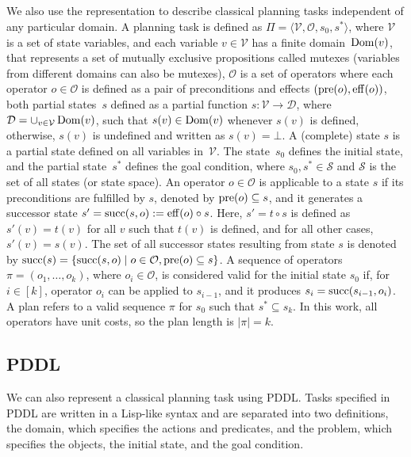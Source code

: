 \documentclass[ppgc,diss,english]{iiufrgs}
\begin{document}
\subsection{\sas}
\label{sec:background-sas}
We also use the \sas representation to describe classical planning tasks independent of any particular domain. A \sas planning task is defined as $\Pi=\langle\mathcal{V},\mathcal{O},s_0,s^*\rangle$, where $\mathcal{V}$ is a set of state variables, and each variable $v\in \mathcal{V}$ has a finite domain~$\operatorname{Dom}(v)$, that represents a set of mutually exclusive propositions called mutexes (variables from different domains can also be mutexes), $\mathcal{O}$ is a set of operators where each operator $o \in \mathcal{O}$ is defined as a pair of preconditions and effects $(\operatorname{pre}(o),\operatorname{eff}(o))$, both partial states~$s$ defined as a partial function $s:\mathcal{V}\rightarrow \mathcal{D}$, where $\mathcal{D}=\cup_{v\in \mathcal{V}}\operatorname{Dom}(v)$, such that $s(v)\in \operatorname{Dom}(v)$ whenever $s(v)$ is defined, otherwise, $s(v)$ is undefined and written as $s(v)=\bot$.  A (complete) state $s$ is a partial state defined on all variables in~$\mathcal{V}$. The state~$s_0$ defines the initial state, and the partial state~$s^*$ defines the goal condition, where $s_0, s^* \in \mathcal{S}$ and $\mathcal{S}$ is the set of all states (or state space).
An operator $o \in \mathcal{O}$ is applicable to a state $s$ if its preconditions are fulfilled by $s$, denoted by $\operatorname{pre}(o) \subseteq s$, and it generates a successor state $s'=\operatorname{succ}(s,o):=\operatorname{eff}(o)\circ s$. Here, $s'=t\circ s$ is defined as $s'(v)=t(v)$ for all $v$ such that $t(v)$ is defined, and for all other cases, $s'(v)=s(v)$. The set of all successor states resulting from state $s$ is denoted by $\operatorname{succ}(s)=\{{\operatorname{succ}(s,o)\mid o\in \mathcal{O}, \operatorname{pre}(o) \subseteq s}\}$. A sequence of operators $\pi=(o_1,\ldots,o_k)$, where $o_i\in \mathcal{O}$, is considered valid for the initial state $s_0$ if, for $i\in[k]$, operator $o_i$ can be applied to $s_{i-1}$, and it produces $s_i=\operatorname{succ}(s_{i-1},o_i)$. A plan refers to a valid sequence $\pi$ for $s_0$ such that $s^* \subseteq s_k$. In this work, all operators have unit costs, so the plan length is $|\pi| = k$.

\subsection{PDDL}
\label{sec:background-pddl}
We can also represent a classical planning task using PDDL. Tasks specified in PDDL are written in a Lisp-like syntax and are separated into two definitions, the domain, which specifies the actions and predicates, and the problem, which specifies the objects, the initial state, and the goal condition.
\end{document}
